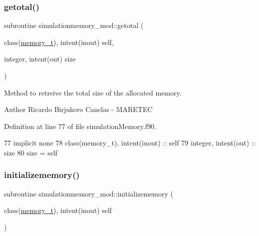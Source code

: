 \subsubsection{\texorpdfstring{getotal()}{getotal()}}
{\footnotesize\ttfamily subroutine simulationmemory\+\_\+mod\+::getotal (\begin{DoxyParamCaption}\item[{class(\mbox{\hyperlink{structsimulationmemory__mod_1_1memory__t}{memory\+\_\+t}}), intent(inout)}]{self,  }\item[{integer, intent(out)}]{size }\end{DoxyParamCaption})\hspace{0.3cm}{\ttfamily [private]}}



Method to retreive the total size of the allocated memory. 

\begin{DoxyAuthor}{Author}
Ricardo Birjukovs Canelas -\/ M\+A\+R\+E\+T\+EC 
\end{DoxyAuthor}


Definition at line 77 of file simulation\+Memory.\+f90.


\begin{DoxyCode}
77     \textcolor{keywordtype}{implicit none}
78     \textcolor{keywordtype}{class}(memory\_t), \textcolor{keywordtype}{intent(inout)} :: self
79     \textcolor{keywordtype}{integer}, \textcolor{keywordtype}{intent(out)} :: size
80     \textcolor{keyword}{size} = self%
\end{DoxyCode}
\mbox{\label{namespacesimulationmemory__mod_afaf06c4001ebc289c12a9358a99d224d}} 
\subsubsection{\texorpdfstring{initializememory()}{initializememory()}}
{\footnotesize\ttfamily subroutine simulationmemory\+\_\+mod\+::initializememory (\begin{DoxyParamCaption}\item[{class(\mbox{\hyperlink{structsimulationmemory__mod_1_1memory__t}{memory\+\_\+t}}), intent(inout)}]{self }\end{DoxyParamCaption})\hspace{0.3cm}{\ttfamily [private]}}



